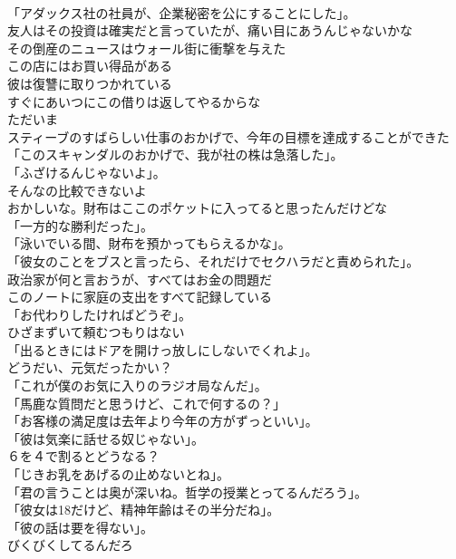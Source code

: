 \documentclass[8pt]{extreport}
\begin{document}
\begin{CJK}{UTF8}{min}
\\	「アダックス社の社員が、企業秘密を公にすることにした」。	
\\	友人はその投資は確実だと言っていたが、痛い目にあうんじゃないかな	
\\	その倒産のニュースはウォール街に衝撃を与えた	
\\	この店にはお買い得品がある	
\\	彼は復讐に取りつかれている	
\\	すぐにあいつにこの借りは返してやるからな	
\\	ただいま	
\\	スティーブのすばらしい仕事のおかげで、今年の目標を達成することができた	
\\	「このスキャンダルのおかげで、我が社の株は急落した」。	
\\	「ふざけるんじゃないよ」。	
\\	そんなの比較できないよ	
\\	おかしいな。財布はここのポケットに入ってると思ったんだけどな	
\\	「一方的な勝利だった」。	
\\	「泳いでいる間、財布を預かってもらえるかな」。	
\\	「彼女のことをブスと言ったら、それだけでセクハラだと責められた」。	
\\	政治家が何と言おうが、すべてはお金の問題だ	
\\	このノートに家庭の支出をすべて記録している	
\\	「お代わりしたければどうぞ」。	
\\	ひざまずいて頼むつもりはない	
\\	「出るときにはドアを開けっ放しにしないでくれよ」。	
\\	どうだい、元気だったかい？	
\\	「これが僕のお気に入りのラジオ局なんだ」。	
\\	「馬鹿な質問だと思うけど、これで何するの？」	
\\	「お客様の満足度は去年より今年の方がずっといい」。	
\\	「彼は気楽に話せる奴じゃない」。	
\\	６を４で割るとどうなる？	
\\	「じきお乳をあげるの止めないとね」。	
\\	「君の言うことは奥が深いね。哲学の授業とってるんだろう」。	
\\	「彼女は18だけど、精神年齢はその半分だね」。	
\\	「彼の話は要を得ない」。	
\\	びくびくしてるんだろ	

\end{CJK}
\end{document}
